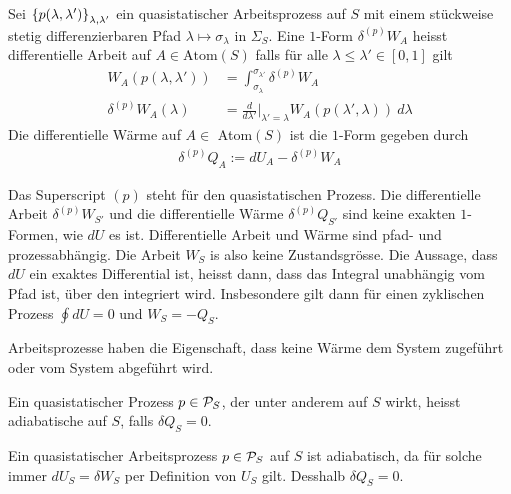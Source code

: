 \begin{definition}
    Sei $\geschwungeneklammer{p(\lambda,\lambda')}_{\lambda,\lambda'}$
    ein quasistatischer Arbeitsprozess auf $S$ mit einem stückweise stetig
    differenzierbaren Pfad $\lambda \mapsto \sigma_\lambda$ in $\Sigma_S$.
    Eine $1$-Form $\delta^{(p)} W_A$ heisst differentielle Arbeit auf $A
    \in \text{Atom}(S)$ falls für alle $\lambda \leq \lambda' \in [0,1]$
    gilt
    \begin{align*}
        W_A (p(\lambda,\lambda')) &=
        \int_{\sigma_\lambda}^{\sigma_{\lambda'}} \delta^{(p)} W_A
        \\
        \delta^{(p)} W_A (\lambda) &=
        \frac{d}{d \lambda'} \Big|_{\lambda' = \lambda} W_A (p(\lambda',\lambda)) \ d \lambda
    \end{align*}
    Die differentielle Wärme auf $A \in$ Atom$(S)$ ist die $1$-Form gegeben durch
    \begin{align*}
        \delta^{(p)} Q_A := d U_A - \delta^{(p)} W_A
    \end{align*}
\end{definition}

\begin{bemerkung}
    Das Superscript $(p)$ steht für den quasistatischen Prozess. Die
    differentielle Arbeit $\delta^{(p)} W_{S'}$ und die differentielle
    Wärme $\delta^{(p)} Q_{S'}$ sind keine exakten $1$-Formen, wie $dU$ es
    ist. Differentielle Arbeit und Wärme sind pfad- und prozessabhängig.
    Die Arbeit $W_S$ is also keine Zustandsgrösse. Die Aussage, dass $dU$
    ein exaktes Differential ist, heisst dann, dass das Integral unabhängig
    vom Pfad ist, über den integriert wird. Insbesondere gilt dann für
    einen zyklischen Prozess $\oint dU = 0$ und $W_S = - Q_S$.
\end{bemerkung}

\begin{bemerkung}
    Arbeitsprozesse haben die Eigenschaft, dass keine Wärme dem System zugeführt
    oder vom System abgeführt wird.
\end{bemerkung}

\begin{definition}
    Ein quasistatischer Prozess $p \in \P_S$, der unter anderem auf $S$ wirkt,
    heisst adiabatische auf $S$, falls $\delta Q_S = 0$.
\end{definition}

\begin{bemerkung}
    Ein quasistatischer Arbeitsprozess $p \in \P_S$ auf $S$ ist adiabatisch, da
    für solche immer $dU_S = \delta W_S$ per Definition von $U_S$ gilt. Desshalb
    $\delta Q_S = 0$.
\end{bemerkung}


